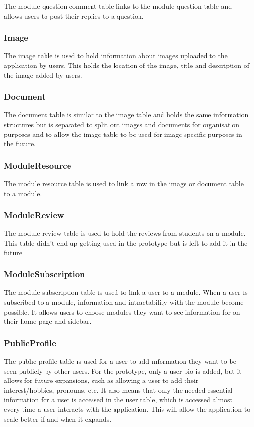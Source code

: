 The module question comment table links to the module question table and allows users to post their replies to a question.

\subsubsection{Image}
The image table is used to hold information about images uploaded to the application by users. This holds the location of the image, title and description of the image added by users.

\subsubsection{Document}
The document table is similar to the image table and holds the same information structures but is separated to split out images and documents for organisation purposes and to allow the image table to be used for image-specific purposes in the future.

\subsubsection{ModuleResource}
The module resource table is used to link a row in the image or document table to a module.

\subsubsection{ModuleReview}
The module review table is used to hold the reviews from students on a module. This table didn't end up getting used in the prototype but is left to add it in the future.

\subsubsection{ModuleSubscription}
The module subscription table is used to link a user to a module. When a user is subscribed to a module, information and intractability with the module become possible. It allows users to choose modules they want to see information for on their home page and sidebar.

\subsubsection{PublicProfile}
The public profile table is used for a user to add information they want to be seen publicly by other users. For the prototype, only a user bio is added, but it allows for future expansions, such as allowing a user to add their interest/hobbies, pronouns, etc. It also means that only the needed essential information for a user is accessed in the user table, which is accessed almost every time a user interacts with the application. This will allow the application to scale better if and when it expands.

